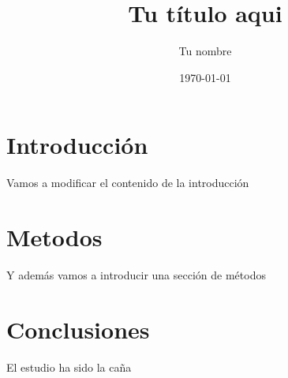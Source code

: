 \documentclass{article}
\title{Tu título aqui}
\author{Tu nombre}
\date{\today}
\begin{document}
\maketitle

\section{Introducción}

Vamos a modificar el contenido de la introducción
\section {Metodos}

Y además vamos a introducir una sección de métodos

\section{Conclusiones}

El estudio ha sido la caña
\end{document}

